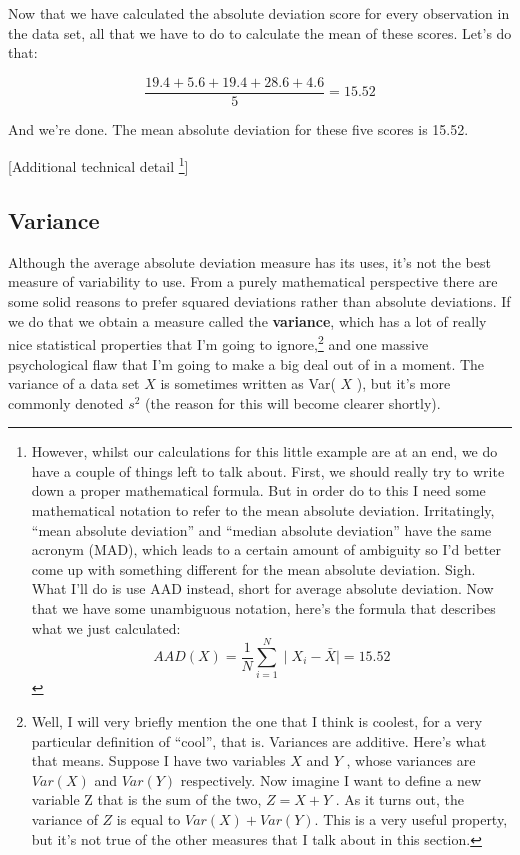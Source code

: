 \documentclass[
]{book}
\begin{document}
Now that we have calculated the absolute deviation score for every observation in the data set, all that we have to do to calculate the mean of these scores. Let's do that:

\[
\frac{19.4 + 5.6 + 19.4 + 28.6 + 4.6}{5} = 15.52
\]

And we're done. The mean absolute deviation for these five scores is 15.52.

{{[}Additional technical detail \footnote{However, whilst our calculations for this little example are at an end, we do have a couple of things left to talk about. First, we should really try to write down a proper mathematical formula. But in order do to this I need some mathematical notation to refer to the mean absolute deviation. Irritatingly, ``mean absolute deviation'' and ``median absolute deviation'' have the same acronym (MAD), which leads to a certain amount of ambiguity so I'd better come up with something different for the mean absolute deviation. Sigh. What I'll do is use AAD instead, short for average absolute deviation. Now that we have some unambiguous notation, here's the formula that describes what we just calculated: \[AAD(X) =\frac{1}{N} \sum_{i=1}^{N} \mid X_i - \bar{X} \mid = 15.52\]}{]}}

\hypertarget{variance}{%
\subsection{Variance}\label{variance}}

Although the average absolute deviation measure has its uses, it's not the best measure of variability to use. From a purely mathematical perspective there are some solid reasons to prefer squared deviations rather than absolute deviations. If we do that we obtain a measure called the \textbf{variance}, which has a lot of really nice statistical properties that I'm going to ignore,\footnote{Well, I will very briefly mention the one that I think is coolest, for a very particular definition of ``cool'', that is. Variances are additive. Here's what that means. Suppose I have two variables \(X\) and \(Y\) , whose variances are \(Var(X)\) and \(Var(Y)\) respectively. Now imagine I want to define a new variable Z that is the sum of the two, \(Z = X + Y\) . As it turns out, the variance of \(Z\) is equal to \(Var(X) + Var(Y)\). This is a very useful property, but it's not true of the other measures that I talk about in this section.} and one massive psychological flaw that I'm going to make a big deal out of in a moment. The variance of a data set \(X\) is sometimes written as Var( \(X\) ), but it's more commonly denoted \(s^2\) (the reason for this will become clearer shortly).
\end{document}
